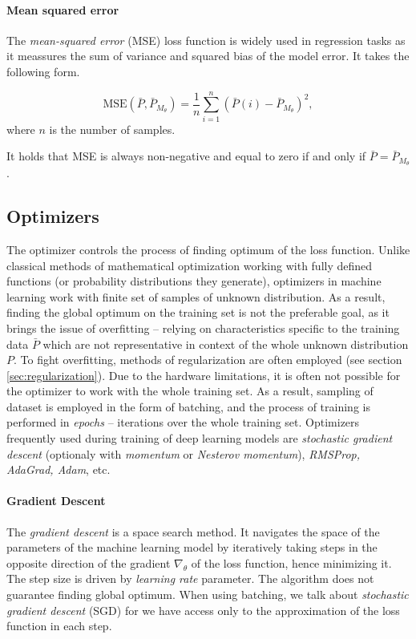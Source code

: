 \paragraph{Mean squared error}
The \emph{mean-squared error} (MSE) loss function is widely used in regression tasks as it meassures the sum of variance and squared bias of the model error. It takes the following form.

\begin{equation} \label{eqn:mse}
\text{MSE}\left(\bar{P}, \bar{P}_{M_\theta}\right) = \frac{1}{n} \sum\limits_{i=1}^{n} \left(\bar{P}(i) - \bar{P}_{M_\theta}\right)^2,
\end{equation} where $n$ is the number of samples.

It holds that MSE is always non-negative and equal to zero if and only if $\bar{P} = \bar{P}_{M_\theta}$.

\subsection{Optimizers}
\label{sec:optimizers}

The optimizer controls the process of finding optimum of the loss function. Unlike classical methods of mathematical optimization working with fully defined functions (or probability distributions they generate), optimizers in machine learning work with finite set of samples of unknown distribution. As a result, finding the global optimum on the training set is not the preferable goal, as it brings the issue of overfitting -- relying on characteristics specific to the training data $\bar{P}$ which are not representative in context of the whole unknown distribution $P$. To fight overfitting, methods of regularization are often employed (see section \ref{sec:regularization}). Due to the hardware limitations, it is often not possible for the optimizer to work with the whole training set. As a result, sampling of dataset is employed in the form of batching, and the process of training is performed in \emph{epochs} -- iterations over the whole training set. Optimizers frequently used during training of deep learning models are \emph{stochastic gradient descent} (optionaly with \emph{momentum} or \emph{Nesterov momentum}), \emph{RMSProp, AdaGrad, Adam}, etc.

\paragraph{Gradient Descent}

The \emph{gradient descent} is a space search method. It navigates the space of the parameters of the machine learning model by iteratively taking steps in the opposite direction of the gradient $\nabla_\theta$ of the loss function, hence minimizing it. The step size is driven by \emph{learning rate} parameter. The algorithm does not guarantee finding global optimum. When using batching, we talk about \emph{stochastic gradient descent} (SGD) for we have access only to the approximation of the loss function in each step.

